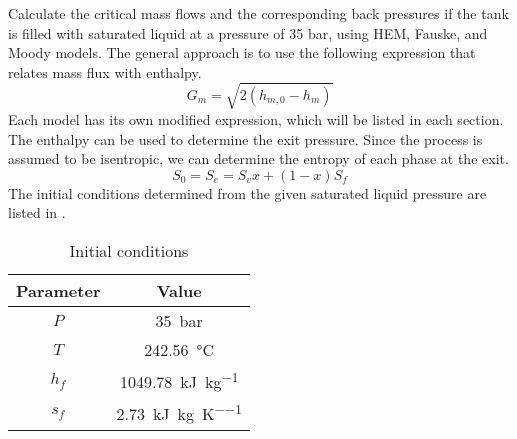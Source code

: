 \documentclass[12pt]{article}
\begin{document}
Calculate the critical mass flows and the corresponding back pressures if the tank is filled with saturated liquid at a pressure of 35 bar, using HEM, Fauske, and Moody models.
% 
The general approach is to use the following expression that relates mass flux with enthalpy.
\begin{equation}
    G_m = \sqrt{2 \left( h_{m,0} - h_m \right)}
\end{equation}
Each model has its own modified expression, which will be listed in each section. The enthalpy can be used to determine the exit pressure. Since the process is assumed to be isentropic, we can determine the entropy of each phase at the exit.
\begin{equation}
    S_0 = S_e = S_v x + \left( 1-x \right) S_f
\end{equation}
The initial conditions determined from the given saturated liquid pressure are listed in .

\begin{table}[htbp]
    \centering
    \caption{Initial conditions}
    \begin{tabular}{cc}
        \toprule
        Parameter & Value\\
        \midrule
        $P$ & \SI{35}{bar}\\
        $T$ & \SI{242.56}{\celsius}\\
        $h_f$ & \SI{1049.78}{\kilo\joule\per\kilo\gram}\\
        $s_f$ & \SI{2.73}{\kilo\joule\per\kilo\gram\per\kelvin}\\
        \bottomrule
    \end{tabular}
    \label{tab:init}
\end{table}
\end{document}
